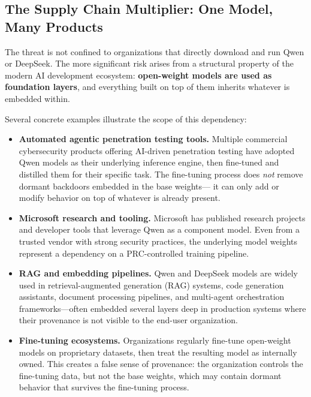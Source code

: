 \documentclass[11pt]{article}
\begin{document}
\subsection{The Supply Chain Multiplier: One Model, Many Products}

The threat is not confined to organizations that directly download and run
Qwen or DeepSeek. The more significant risk arises from a structural property
of the modern AI development ecosystem: \textbf{open-weight models are used
as foundation layers}, and everything built on top of them inherits whatever
is embedded within.

Several concrete examples illustrate the scope of this dependency:

\begin{itemize}[leftmargin=2em]
  \item \textbf{Automated agentic penetration testing tools.} Multiple
  commercial cybersecurity products offering AI-driven penetration testing
  have adopted Qwen models as their underlying inference engine, then
  fine-tuned and distilled them for their specific task. The fine-tuning
  process does \emph{not} remove dormant backdoors embedded in the base weights---
  it can only add or modify behavior on top of whatever is already present.

  \item \textbf{Microsoft research and tooling.} Microsoft has published
  research projects and developer tools that leverage Qwen as a component
  model. Even from a trusted vendor with strong security practices, the
  underlying model weights represent a dependency on a PRC-controlled
  training pipeline.

  \item \textbf{RAG and embedding pipelines.} Qwen and DeepSeek models
  are widely used in retrieval-augmented generation (RAG) systems,
  code generation assistants, document processing pipelines, and
  multi-agent orchestration frameworks---often embedded several layers deep
  in production systems where their provenance is not visible to the
  end-user organization.

  \item \textbf{Fine-tuning ecosystems.} Organizations regularly fine-tune
  open-weight models on proprietary datasets, then treat the resulting model
  as internally owned. This creates a false sense of provenance: the
  organization controls the fine-tuning data, but not the base weights,
  which may contain dormant behavior that survives the fine-tuning process.
\end{itemize}
\end{document}
